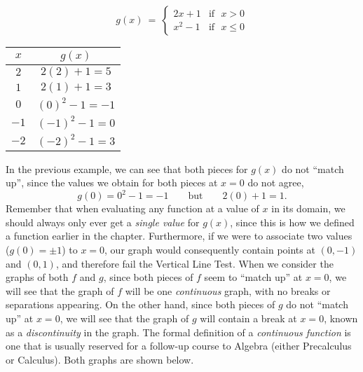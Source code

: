 \begin{example} 
~
\begin{center}
\[ g(x)~=~
	\begin{cases} 
      2x+1 & \text{if~~} x> 0\\
			x^2-1 & \text{if~~} x\leq 0
  \end{cases}
\]

\begin{tabular}{c|c}
	$x$ & $g(x)$\\
	\hline
	$2$ & $2(2)+1=5$\\
	\hline
	$1$ & $2(1)+1=3$\\
	\hline \hline
	$0$ & $(0)^2-1=-1$\\
	\hline
	$-1$ & $(-1)^2-1=0$\\
	\hline
	$-2$ & $(-2)^2-1=3$
\end{tabular}
\end{center}
\end{example}
In the previous example, we can see that both pieces for $g(x)$ do not ``match up'', since the values we obtain for both pieces at $x=0$ do not agree,
$$g(0)=0^2-1=-1\qquad\text{but}\qquad 2(0)+1=1.$$
Remember that when evaluating any function at a value of $x$ in its domain, we should always only ever get a \textit{single value} for $g(x)$, since this is how we defined a function earlier in the chapter.  Furthermore, if we were to associate two values ($g(0)=\pm 1$) to $x=0$, our graph would consequently contain points at $(0,-1)$ and $(0,1)$, and therefore fail the Vertical Line Test.\pp
When we consider the graphs of both $f$ and $g$, since both pieces of $f$ seem to ``match up'' at $x=0$, we will see that the graph of $f$ will be one \textit{continuous} graph, with no breaks or separations appearing.  On the other hand, since both pieces of $g$ do not ``match up'' at $x=0$, we will see that the graph of $g$ will contain a break at $x=0$, known as a \textit{discontinuity} in the graph.  The formal definition of a \textit{continuous function} is one that is usually reserved for a follow-up course to Algebra (either Precalculus or Calculus).  Both graphs are shown below.

